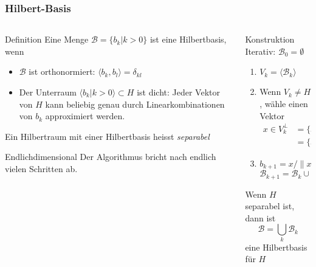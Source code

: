 %
%
%
\bgroup
\begin{frame}[t]
\setlength{\abovedisplayskip}{5pt}
\setlength{\belowdisplayskip}{5pt}
\frametitle{Hilbert-Basis}
\vspace{-20pt}
\begin{columns}[t,onlytextwidth]
\begin{column}{0.48\textwidth}
\begin{block}{Definition}
Eine Menge $\mathcal{B}=\{b_k|k>0\}$ ist eine Hilbertbasis, wenn
\begin{itemize}
\item $\mathcal{B}$ ist orthonormiert: $\langle b_k,b_l\rangle=\delta_{kl}$
\item Der Unterraum $\langle b_k|k>0\rangle\subset H$ ist
dicht:
Jeder Vektor von $H$ kann beliebig genau durch Linearkombinationen von $b_k$
approximiert werden.
\end{itemize}
Ein Hilbertraum mit einer Hilbertbasis heisst {\em separabel}
\end{block}
\begin{block}{Endlichdimensional}
Der Algorithmus bricht nach endlich vielen Schritten ab.
\end{block}
\end{column}
\begin{column}{0.48\textwidth}
\begin{block}{Konstruktion}
Iterativ: $\mathcal{B}_0=\emptyset$
\begin{enumerate}
\item $V_k = \langle \mathcal{B}_k \rangle$
\item Wenn $V_k\ne H$, wähle einen Vektor
\begin{align*}
x\in V_k^{\perp}
&=
\{
x\in H\;|\; x\perp V_k
\}
\\
&=
\{x\in H\;|\;
x\perp y\;\forall y\in V_k
\}
\end{align*}
\item $b_{k+1} = x/\|x\|$
\[
\mathcal{B}_{k+1} = \mathcal{B}_k\cup \{b_{k+1}\}
\]
\end{enumerate}
Wenn $H$ separabel ist, dann ist
\[
\mathcal{B} = \bigcup_{k} \mathcal{B}_k
\]
eine Hilbertbasis für $H$
\end{block}
\end{column}
\end{columns}
\end{frame}
\egroup
